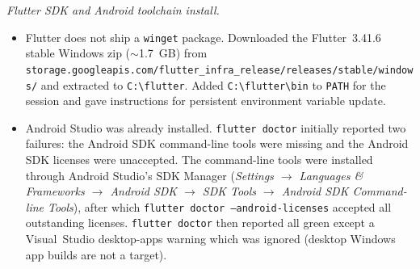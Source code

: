 \documentclass{article}
\theoremstyle{plain}
\theoremstyle{definition}
\theoremstyle{remark}
\begin{document}
\textit{Flutter SDK and Android toolchain install.}
\begin{itemize}
\item Flutter does not ship a \texttt{winget} package. Downloaded the Flutter~3.41.6 stable Windows zip ($\sim$1.7~GB) from \texttt{storage.googleapis.com/flutter\_infra\_release/releases/stable/windows/} and extracted to \texttt{C:\textbackslash flutter}. Added \texttt{C:\textbackslash flutter\textbackslash bin} to \texttt{PATH} for the session and gave instructions for persistent environment variable update.
\item Android Studio was already installed. \texttt{flutter doctor} initially reported two failures: the Android SDK command-line tools were missing and the Android SDK licenses were unaccepted. The command-line tools were installed through Android Studio's SDK Manager (\textit{Settings $\rightarrow$ Languages \& Frameworks $\rightarrow$ Android SDK $\rightarrow$ SDK Tools $\rightarrow$ Android SDK Command-line Tools}), after which \texttt{flutter doctor --android-licenses} accepted all outstanding licenses. \texttt{flutter doctor} then reported all green except a Visual~Studio desktop-apps warning which was ignored (desktop Windows app builds are not a target).
\end{itemize}
\end{document}
